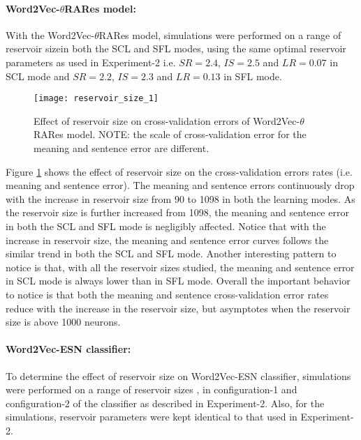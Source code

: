 \paragraph{Word2Vec-$\theta$RARes model: } 

With the Word2Vec-$\theta$RARes model, simulations were performed on a range of reservoir size\footnotemark[1] in both the SCL and SFL modes, using the same optimal reservoir parameters as used in Experiment-2 i.e. $SR = 2.4$, $IS = 2.5$ and $LR = 0.07$ in SCL mode and $SR = 2.2$, $IS = 2.3$ and $LR = 0.13$ in SFL mode. 

\begin{figure}[hbtp]
\centering
\texttt{[image: reservoir\_size\_1]}
\caption[Effect of reservoir size on Word2Vec-$\theta$RARes model.]{Effect of reservoir size on cross-validation errors of Word2Vec-$\theta$RARes model. NOTE: the scale of cross-validation error for the meaning and sentence error are different.}
\label{fig:reservoir_size_1}
\end{figure}

Figure \ref{fig:reservoir_size_1} shows the effect of reservoir size on the cross-validation errors rates (i.e. meaning and sentence error). The meaning and sentence errors continuously drop with the increase in reservoir size from 90 to 1098 in both the learning modes.  As the reservoir size is further increased from 1098, the meaning and sentence error in both the SCL and SFL mode is negligibly affected. Notice that with the increase in reservoir size, the meaning and sentence error curves follows the similar trend in both the SCL and SFL mode. Another interesting pattern to notice is that, with all the reservoir sizes studied, the meaning and sentence error in SCL mode is always lower than in SFL mode. Overall the important behavior to notice is that both the meaning and sentence cross-validation error rates reduce with the increase in the reservoir size, but asymptotes when the reservoir size is above 1000 neurons.

\paragraph{Word2Vec-ESN classifier: } 

To determine the effect of reservoir size on Word2Vec-ESN classifier, simulations were performed on a range of reservoir sizes \footnotemark[2], in configuration-1 and configuration-2 of the classifier as described in Experiment-2. Also, for the simulations, reservoir parameters were kept identical to that used in Experiment-2.

